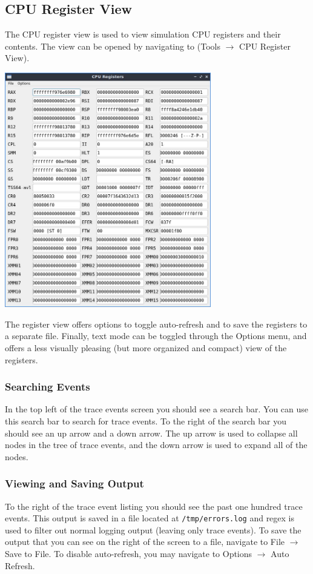 \documentclass{article}
\newcommand{\code}[1]{\texttt{#1}}
\begin{document}
\subsection{CPU Register View}
The CPU register view is used to view simulation CPU registers and their contents. The view can be opened by navigating to (Tools $\rightarrow$ CPU Register View). 

\begin{center}
    \includegraphics[width=90mm]{images/registers_fancy.jpg}
\end{center}

The register view offers options to toggle auto-refresh and to save the registers to a separate file. Finally, text mode can be toggled through the Options menu, and offers a less visually pleasing (but more organized and compact) view of the registers. \newline

\subsubsection{Searching Events}
In the top left of the trace events screen you should see a search bar. You can use this search bar to search for trace events. To the right of the search bar you should see an up arrow and a down arrow. The up arrow is used to collapse all nodes in the tree of trace events, and the down arrow is used to expand all of the nodes. 
\newpage

\subsubsection{Viewing and Saving Output}
To the right of the trace event listing you should see the past one hundred trace events. This output is saved in a file located at \code{/tmp/errors.log} and regex is used to filter out normal logging output (leaving only trace events). 
To save the output that you can see on the right of the screen to a file, navigate to File $\rightarrow$ Save to File. To disable auto-refresh, you may navigate to Options $\rightarrow$ Auto Refresh. \newline
\end{document}
